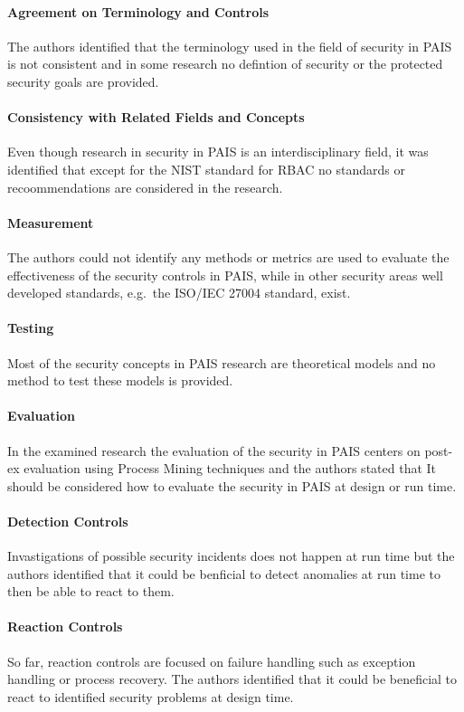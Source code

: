\documentclass[runningheads]{llncs}
\begin{document}
\paragraph{Agreement on Terminology and Controls} The authors identified that the terminology used in the field of security in PAIS is not consistent and in some research no
defintion of security or the protected security goals are provided.
\paragraph{Consistency with Related Fields and Concepts} Even though research in security in PAIS is an interdisciplinary field, it was identified that except for the NIST standard for
RBAC no standards or recoommendations are considered in the research.
\paragraph{Measurement} The authors could not identify any methods or metrics are used to evaluate the effectiveness of the security controls in PAIS, while in other security areas
well developed standards, e.g.\ the ISO/IEC 27004 standard, exist.
\paragraph{Testing} Most of the security concepts in PAIS research are theoretical models and no method to test these models is provided.
\paragraph{Evaluation} In the examined research the evaluation of the security in PAIS centers on post-ex evaluation using Process Mining techniques and the authors stated that It
should be considered how to evaluate the security in PAIS at design or run time.
\paragraph{Detection Controls} Invastigations of possible security incidents does not happen at run time but the authors identified that it could be benficial to detect anomalies
at run time to then be able to react to them.
\paragraph{Reaction Controls} So far, reaction controls are focused on failure handling such as exception handling or process recovery. The authors identified that it could be beneficial
to react to identified security problems at design time.
\end{document}
